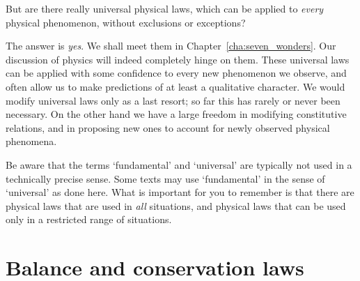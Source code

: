 \documentclass[a4paper,12pt,%
onecolumn,oneside,titlepage,%
british%
]{memoir}
\renewcommand*{\|}[1][]{\nonscript\:#1\vert\nonscript\:\mathopen{}}
\newcommand*{\chap}{Chapter}%
\begin{document}
But are there really universal physical laws, which can be applied to \emph{every} physical phenomenon, without exclusions or exceptions?

The answer is \emph{yes}. We shall meet them in \chap~\ref{cha:seven_wonders}. Our discussion of physics will indeed completely hinge on them. These universal laws can be applied with some confidence to every new phenomenon we observe, and often allow us to make predictions of at least a qualitative character. We would modify universal laws only as a last resort; so far this has rarely or never been necessary. On the other hand we have a large freedom in modifying constitutive relations, and in proposing new ones to account for newly observed physical phenomena.

\begin{warning}
  Be aware that the terms \enquote*{fundamental} and \enquote*{universal} are typically not used in a technically precise sense. Some texts may use \enquote*{fundamental} in the sense of \enquote*{universal} as done here. What is important for you to remember is that there are physical laws that are used in \emph{all} situations, and physical laws that can be used only in a restricted range of situations.
\end{warning}

\section{Balance and conservation laws}
\label{sec:balance_intro}
\end{document}
